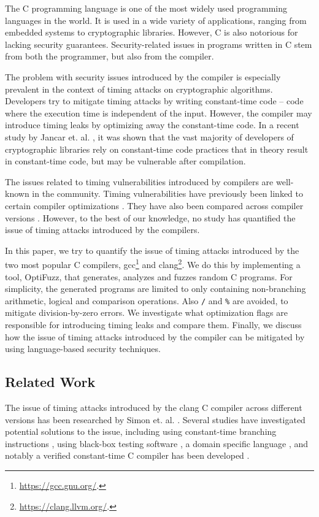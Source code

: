 The C programming language is one of the most widely used programming languages in the world. 
It is used in a wide variety of applications, ranging from embedded systems to cryptographic libraries. 
However, C is also notorious for lacking security guarantees.
Security-related issues in programs written in C stem from both the programmer, but also from the compiler.

The problem with security issues introduced by the compiler is especially prevalent in the context of timing attacks on cryptographic algorithms. 
Developers try to mitigate timing attacks by writing constant-time code -- code where the execution time is independent of the input.
However, the compiler may introduce timing leaks by optimizing away the constant-time code.
In a recent study by Jancar et. al. \cite{developer-survey-timing-attacks}, it was shown that the vast majority of developers of cryptographic libraries rely on constant-time code practices that in theory result in constant-time code, but may be vulnerable after compilation.

The issues related to timing vulnerabilities introduced by compilers are well-known in the community.
Timing vulnerabilities have previously been linked to certain compiler optimizations \cite{optimizations-linked-to-timing-attacks}.
They have also been compared across compiler versions \cite{what-you-c}.
However, to the best of our knowledge, no study has quantified the issue of timing attacks introduced by the compilers.

In this paper, we try to quantify the issue of timing attacks introduced by the two most popular C compilers, gcc\footnote{\url{https://gcc.gnu.org/}.} and clang\footnote{\url{https://clang.llvm.org/}.}.
We do this by implementing a tool, OptiFuzz, that generates, analyzes and fuzzes random C programs.
For simplicity, the generated programs are limited to only containing non-branching arithmetic, logical and comparison operations.
Also \texttt{/} and \texttt{\%} are avoided, to mitigate division-by-zero errors.
We investigate what optimization flags are responsible for introducing timing leaks and compare them.
Finally, we discuss how the issue of timing attacks introduced by the compiler can be mitigated by using language-based security techniques.

\subsection{Related Work}
The issue of timing attacks introduced by the clang C compiler across different versions has been researched by Simon et. al. \cite{what-you-c}. 
Several studies have investigated potential solutions to the issue, including using constant-time branching instructions \cite{what-you-c}, using black-box testing software \cite{dudect}, a domain specific language \cite{fact}, and notably a verified constant-time C compiler has been developed \cite{verified-constant-time-c-comiler}.

